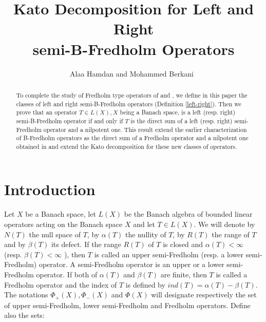 \documentclass[10pt]{article}
\numberwithin{equation}{section}
\begin{document}
\title{Kato Decomposition for Left and Right\\ semi-B-Fredholm Operators }

\author { Alaa Hamdan and  
Mohammed Berkani\ }



\maketitle \setcounter{page}{1}

\date{}

\begin{abstract} To complete the study of Fredholm type operators of  \cite{HB1} and \cite{HB2},   we define in this paper the classes  of  left and right  semi-B-Fredholm operators (Definition \ref{left-right}). Then  we prove  that an operator  $T \in L(X), X$ being a Banach space, is  a left (resp. right) semi-B-Fredholm operator if and only if $T$ is the direct sum of a left (resp. right) semi-Fredholm operator and a nilpotent one. This result extend the earlier  characterization of  B-Fredholm operators as the direct sum of a Fredholm operator and a nilpotent one obtained in \cite[Theorem 2.7]{P7} and extend the Kato decomposition \cite[Theorem 4]{KA} for these new classes of operators.
 \end{abstract}

\renewcommand{\thefootnote}{}

\section{Introduction}

Let $X$ be a Banach space,
let $L(X)$  be the Banach algebra of bounded linear operators acting on
the Banach space $X$ and let  $ T \in L(X).$
We will denote by $N(T)$  the null space of  $T$,  by $ \alpha(T)$
the nullity of $T$,  by $ R(T)$ the range of $T$ and by $\beta(T) $
its defect. If the range $ R(T)$ of $T$ is closed  and  $ \alpha(T) < \infty $
 (resp.  $\beta(T)< \infty $ ),
\noindent  then $T$ is called an upper semi-Fredholm (resp. a
lower semi-Fredholm) operator. A semi-Fredholm operator is an
upper or a lower semi-Fredholm operator. If both of $ \alpha(T) $
and $\beta(T) $ are finite, then $T $ is called a Fredholm operator
and the index of $T$  is defined by   $ ind(T) = \alpha(T) -
\beta(T). $  The notations $\Phi_+(X),  \Phi_-(X)$ and  $\Phi(X)$ will designate  respectively
the set of upper semi-Fredholm, lower semi-Fredholm and Fredholm operators. Define also  the sets:
\end{document}
